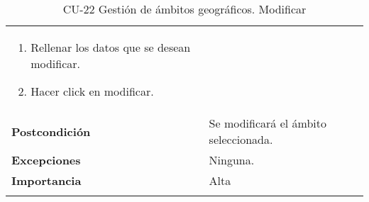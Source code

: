 \begin{longtable}[H]{@{}ll@{}}
\begin{minipage}[t]{0.71\columnwidth}
\begin{enumerate}
\item
Rellenar los datos que se desean modificar.
\item
Hacer click en modificar.
\end{enumerate}\strut
\end{minipage}\tabularnewline
\begin{minipage}[t]{0.23\columnwidth}\raggedright\strut
\textbf{Postcondición}\strut
\end{minipage} & \begin{minipage}[t]{0.71\columnwidth}\raggedright\strut
Se modificará el ámbito seleccionada.\strut
\end{minipage}\tabularnewline
\begin{minipage}[t]{0.23\columnwidth}\raggedright\strut
\textbf{Excepciones}\strut
\end{minipage} & \begin{minipage}[t]{0.71\columnwidth}\raggedright\strut
Ninguna. \strut
\end{minipage}\tabularnewline
\begin{minipage}[t]{0.23\columnwidth}\raggedright\strut
\textbf{Importancia}\strut
\end{minipage} & \begin{minipage}[t]{0.71\columnwidth}\raggedright\strut
Alta\strut
\end{minipage}\tabularnewline
\bottomrule
\caption{CU-22 Gestión de ámbitos geográficos. Modificar}
\end{longtable}

